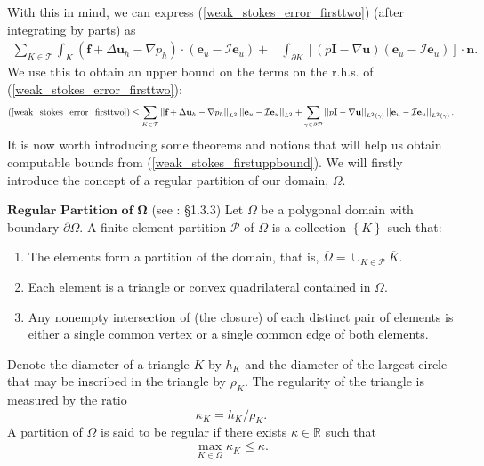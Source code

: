 \documentclass{article}
\begin{document}
With this in mind, we can express (\ref{weak_stokes_error_firsttwo}) (after integrating by parts) as
\begin{equation}
\begin{aligned}
\sum_{K\in\mathcal{T}}\int_{K}\left(\textbf{f}+\Delta \textbf{u}_h-\nabla p_h\right)\cdot\left(\textbf{e}_u-\mathcal{I}\textbf{e}_u\right)+&\int_{\partial K}\left[\left(p\textbf{I}-\nabla\textbf{u}\right)\left(\textbf{e}_u-\mathcal{I}\textbf{e}_u\right)\right]\cdot\textbf{n}.
\end{aligned}
\end{equation}
We use this to obtain an upper bound on the terms on the r.h.s. of (\ref{weak_stokes_error_firsttwo}):
\begin{equation}\label{weak_stokes_firstuppbound}\small
\begin{aligned}
\text{(\ref{weak_stokes_error_firsttwo})}\leq\sum_{K\in\mathcal{T}}\left|\left|\textbf{f}+\Delta \textbf{u}_h-\nabla p_h\right|\right|_{L^2}\left|\left|\textbf{e}_u-\mathcal{I}\textbf{e}_u\right|\right|_{L^2} +\sum_{\gamma\in \partial \mathcal{P}}\left|\left|p\textbf{I}-\nabla\textbf{u}\right|\right|_{L^2\left(\gamma\right)}\left|\left|\textbf{e}_u-\mathcal{I}\textbf{e}_u\right|\right|_{L^2\left(\gamma\right)}.
\end{aligned}
\end{equation}
It is now worth introducing some theorems and notions that will help us obtain computable bounds from (\ref{weak_stokes_firstuppbound}).  We will firstly introduce the concept of a regular partition of our domain, $\Omega$.
\begin{definition}{$\textbf{Regular Partition of } \bm{\Omega}$ (see \cite{ainsworth2011posteriori}: \S1.3.3)}
	Let $\Omega$ be a polygonal domain with boundary $\partial \Omega$.  A finite element partition $\mathcal{P}$ of $\Omega$ is a collection $\left\{K\right\}$ such that:
	\begin{enumerate}
		\item The elements form a partition of the domain, that is, $\overline{\Omega}=\cup_{K\in\mathcal{P}}\overline{K}$.
		\item Each element is a triangle or convex quadrilateral contained in $\Omega$.
		\item Any nonempty intersection of (the closure) of each distinct pair of elements is either a single common vertex or a single common edge of both elements.
	\end{enumerate}
	Denote the diameter of a triangle $K$ by $h_K$ and the diameter of the largest circle that may be inscribed in the triangle by $\rho_K$.  The regularity of the triangle is measured by the ratio
	\begin{equation}
	\kappa_K=h_K/\rho_K.\nonumber
	\end{equation}
	A partition of $\Omega$ is said to be regular if there exists $\kappa\in\mathbb{R}$ such that
	\begin{equation}
	\max_{K\in\Omega}\kappa_K\leq\kappa.\nonumber
	\end{equation}
\end{definition}
\end{document}
